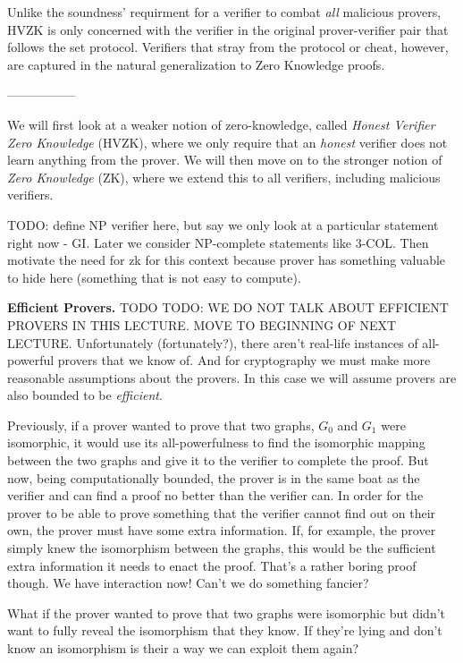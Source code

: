 		Unlike the soundness' requirment for a verifier to combat \textit{all} malicious provers, HVZK is only concerned with the verifier in the original prover-verifier pair that follows the set protocol.  Verifiers that stray from the protocol or cheat, however, are captured in the natural generalization to Zero Knowledge proofs.

	-----------------

	We will first look at a weaker notion of zero-knowledge, called \textit{Honest Verifier Zero Knowledge} (HVZK), where we only require that an {\em honest} verifier does not learn anything from the prover. We will then move on to the stronger notion of \textit{Zero Knowledge} (ZK), where we extend this to all verifiers, including malicious verifiers. \smallskip

		TODO: define NP verifier here, but say we only look at a particular statement right now - GI. Later we consider NP-complete statements like 3-COL. Then motivate the need for zk for this context because prover has something valuable to hide here (something that is not easy to compute).

\bigskip
\noindent\textbf{Efficient Provers.} TODO TODO: WE DO NOT TALK ABOUT EFFICIENT PROVERS IN THIS LECTURE. MOVE TO BEGINNING OF NEXT LECTURE.
		Unfortunately (fortunately?), there aren't real-life instances of all-powerful provers that we know of.  And for cryptography we must make more reasonable assumptions about the provers.  In this case we will assume provers are also bounded to be \emph{efficient}.
		
		Previously, if a prover wanted to prove that two graphs, $G_0$ and $G_1$ were isomorphic, it would use its all-powerfulness to find the isomorphic mapping between the two graphs and give it to the verifier to complete the proof.  But now, being computationally bounded, the prover is in the same boat as the verifier and can find a proof no better than the verifier can.  In order for the prover to be able to prove something that the verifier cannot find out on their own, the prover must have some extra information.  If, for example, the prover simply knew the isomorphism between the graphs, this would be the sufficient extra information it needs to enact the proof.  That's a rather boring proof though.  We have interaction now!  Can't we do something fancier?
		
		What if the prover wanted to prove that two graphs were isomorphic but didn't want to fully reveal the isomorphism that they know.  If they're lying and don't know an isomorphism is their a way we can exploit them again?
		
